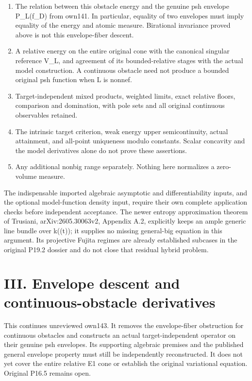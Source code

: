 \documentclass[
  10pt,
]{article}
\providecommand{\tightlist}{%
  \setlength{\itemsep}{0pt}\setlength{\parskip}{0pt}}
\begin{document}
\begin{enumerate}
\def\labelenumi{\arabic{enumi}.}
\tightlist
\item
  The relation between this obstacle energy and the genuine psh envelope
  P\_L(f\_D) from own141. In particular, equality of two envelopes must
  imply equality of the energy and atomic measure. Birational invariance
  proved above is not this envelope-fiber descent.
\item
  A relative energy on the entire original cone with the canonical
  singular reference V\_L, and agreement of its bounded-relative stages
  with the actual model construction. A continuous obstacle need not
  produce a bounded original psh function when L is nonnef.
\item
  Target-independent mixed products, weighted limits, exact relative
  floors, comparison and domination, with pole sets and all original
  continuous observables retained.
\item
  The intrinsic target criterion, weak energy upper semicontinuity,
  actual attainment, and all-point uniqueness modulo constants. Scalar
  concavity and the model derivatives alone do not prove these
  assertions.
\item
  Any additional nonbig range separately. Nothing here normalizes a
  zero-volume measure.
\end{enumerate}

The indispensable imported algebraic asymptotic and differentiability
inputs, and the optional model-function density input, require their own
complete application checks before independent acceptance. The newer
entropy approximation theorem of Trusiani, arXiv:2605.30063v2, Appendix
A.2, explicitly keeps an ample generic line bundle over k((t)); it
supplies no missing general-big equation in this argument. Its
projective Fujita regimes are already established subcases in the
original P19.2 dossier and do not close that residual hybrid problem.

\section{III. Envelope descent and continuous-obstacle
derivatives}\label{iii.-envelope-descent-and-continuous-obstacle-derivatives}

This continues unreviewed own143. It removes the envelope-fiber
obstruction for continuous obstacles and constructs an actual
target-independent operator on their genuine psh envelopes. Its
supporting algebraic premises and the published general envelope
property must still be independently reconstructed. It does not yet
cover the entire relative E1 cone or establish the original variational
equation. Original P16.5 remains open.
\end{document}
